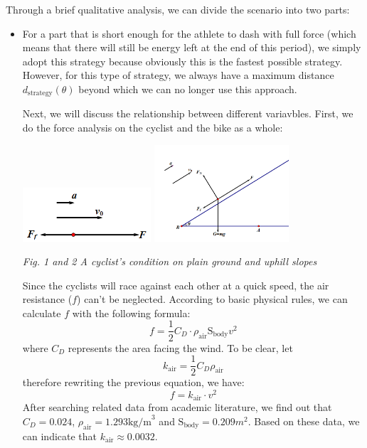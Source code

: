\documentclass[12pt]{article}
\theoremstyle{definition}
\theoremstyle{remark}
\numberwithin{equation}{section}
\begin{document}
	Through a brief qualitative analysis, we can divide the scenario into two parts:
	\begin{itemize}
		\item For a part that is short enough for the athlete to dash with full force (which means that there will still be energy left at the end of this period), we simply adopt this strategy because obviously this is the fastest possible strategy. However, for this type of strategy, we always have a maximum distance \(d_{\mathrm{strategy}}\left(\theta\right)\) beyond which we can no longer use this approach.


			Next, we will discuss the relationship between different variavbles. First, we do the force analysis on the cyclist and the bike as a whole:

			\begin{center}
				\includegraphics[height=2cm]{4.png}
				\includegraphics[width=5cm]{5.png}

				\small \textit{Fig. 1 and 2 A cyclist's condition on plain ground and uphill slopes}
			\end{center}

			Since the cyclists will race against each other at a quick speed, the air resistance ($f$) can't be neglected. According to basic physical rules, we can calculate \(f\) with the following formula:
			$$f=\dfrac{1}{2}  C _ D  \cdot \rho_\mathrm{air} \mathrm{S}_\mathrm{body} v^2$$
			where \(C_D\) represents the area facing the wind. To be clear, let
			$$ k _\mathrm{air}=\dfrac{1}{2}  C _ D  \rho_\mathrm{air}$$
			therefore rewriting the previous equation, we have:
			$$f= k _\mathrm{air}\cdot v^2$$
			After searching related data from academic literature, we find out that $ C _ D =0.024$, $\rho_\mathrm{air}=1.293 \mathrm{kg/m}^3$ and $\mathrm{S}_\mathrm{body}=0.209 m^2$. Based on these data, we can indicate that $ k _\mathrm{air}\approx0.0032$.


\end{itemize}
\end{document}
